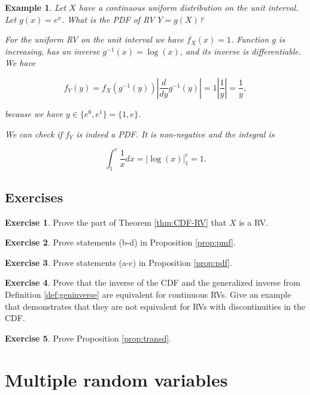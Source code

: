 \documentclass{book}
\theoremstyle{plain}%
\newtheorem{prototheorem}{Example}[section]
\newenvironment{cexample}
   {\colorlet{shadecolor}{gray!10}\begin{shaded}\begin{prototheorem}}
   {\end{prototheorem}\end{shaded}}
\theoremstyle{definition}
\newtheorem{exercise}{Exercise}[chapter]
\begin{document}
\begin{cexample}
Let $X$ have a continuous uniform distribution on the unit interval. Let $g(x) = e^x$. What is the PDF of RV $Y = g(X)$?

For the uniform RV on the unit interval we have $f_X(x) = 1$. Function $g$ is increasing, has an inverse $g^{-1}(x) = \log(x)$, and its inverse is differentiable. We have

$$f_Y(y) = f_X(g^{-1}(y)) |\frac{d}{dy}g^{-1}(y)| = 1 |\frac{1}{y}| = \frac{1}{y},$$

because we have $y \in \{e^0, e^1\} = \{1, e\}$.

We can check if $f_Y$ is indeed a PDF. It is non-negative and the integral is

$$\int_1^e \frac{1}{x} dx = |\log(x)|_{1}^e = 1.$$


\end{cexample}

\section*{Exercises}

\begin{exercise}
Prove the part of Theorem \ref{thm:CDF-RV} that $X$ is a RV.
\end{exercise}

\begin{exercise}
Prove statements (b-d) in Proposition \ref{prop:pmf}.
\end{exercise}

\begin{exercise}
Prove statements (a-c) in Proposition \ref{prop:pdf}.
\end{exercise}

\begin{exercise}
Prove that the inverse of the CDF and the generalized inverse from Definition \ref{def:geninverse} are equivalent for continuous RVs. Give an example that demonstrates that they are not equivalent for RVs with discontinuities in the CDF.
\end{exercise}

\begin{exercise}
Prove Proposition \ref{prop:transd}.
\end{exercise}



\chapter{Multiple random variables}
\end{document}
